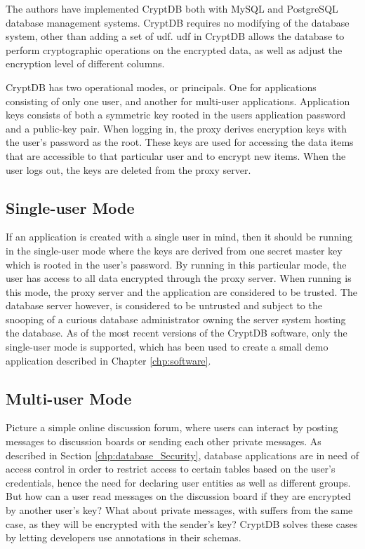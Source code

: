 The authors \citep{CryptDB_Main_Paper} have implemented CryptDB both with MySQL and PostgreSQL database management systems. CryptDB requires no modifying of the database system, other than adding a set of \Gls{udf}. \Gls{udf} in CryptDB allows the database to perform cryptographic operations on the encrypted data, as well as adjust the encryption level of different columns.

CryptDB has two operational modes, or principals. One for applications consisting of only one user, and another for multi-user applications. Application keys consists of both a symmetric key rooted in the users application password and a public-key pair. When logging in, the proxy derives encryption keys with the user's password as the root. These keys are used for accessing the data items that are accessible to that particular user and to encrypt new items. When the user logs out, the keys are deleted from the proxy server.

\subsection{Single-user Mode}
If an application is created with a single user in mind, then it should be running in the single-user mode where the keys are derived from one secret master key which is rooted in the user's password. By running in this particular mode, the user has access to all data encrypted through the proxy server. When running is this mode, the proxy server and the application are considered to be trusted. The database server however, is considered to be untrusted and subject to the snooping of a curious database administrator owning the server system hosting the database. As of the most recent versions of the CryptDB software, only the single-user mode is supported, which has been used to create a small demo application described in Chapter \ref{chp:software}.

\subsection{Multi-user Mode}
Picture a simple online discussion forum, where users can interact by posting messages to discussion boards or sending each other private messages. As described in Section \ref{chp:database_Security}, database applications are in need of access control in order to restrict access to certain tables based on the user's credentials, hence the need for declaring user entities as well as different groups. But how can a user read messages on the discussion board if they are encrypted by another user's key? What about private messages, with suffers from the same case, as they will be encrypted with the sender's key? CryptDB solves these cases by letting developers use annotations in their schemas.

